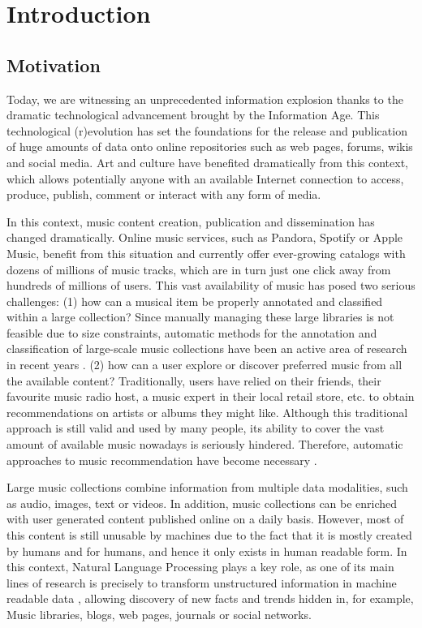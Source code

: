
\chapter{Introduction}
\label{sec:intro}

\section{Motivation}
\label{sec:intro:motivation}

Today, we are witnessing an unprecedented information explosion thanks to the dramatic technological advancement brought by the Information Age. This technological (r)evolution has set the foundations for the release and publication of huge amounts of data onto online repositories such as web pages, forums, wikis and social media. Art and culture have benefited dramatically from this context, which allows potentially anyone with an available Internet connection to access, produce, publish, comment or interact with any form of media. 

In this context, music content creation, publication and dissemination has changed dramatically. Online music services, such as Pandora, Spotify or Apple Music, benefit from this situation and currently offer ever-growing catalogs with dozens of millions of music tracks, which are in turn just one click away from hundreds of millions of users. This vast availability of music has posed two serious challenges: (1) how can a musical item be properly annotated and classified within a large collection? Since manually managing these large libraries is not feasible due to size constraints, automatic methods for the annotation and classification of large-scale music collections have been an active area of research in recent years \cite{Schedl2014}. (2) how can a user explore or discover preferred music from all the available content? Traditionally, users have relied on their friends, their favourite music radio host, a music expert in their local retail store, etc. to obtain recommendations on artists or albums they might like. Although this traditional approach is still valid and used by many people, its ability to cover the vast amount of available music nowadays is seriously hindered. Therefore, automatic approaches to music recommendation have become necessary \cite{celma2008new}.

Large music collections combine information from multiple data modalities, such as audio, images, text or videos. In addition, music collections can be enriched with user generated content published online on a daily basis. However, most of this content is still unusable by machines due to the fact that it is mostly created by humans and for humans, and hence it only exists in human readable form. In this context, Natural Language Processing plays a key role, as one of its main lines of research is precisely to transform unstructured information in machine readable data \cite{cowie1996information}, allowing discovery of new facts and trends hidden in, for example, Music libraries, blogs, web pages, journals or social networks.

